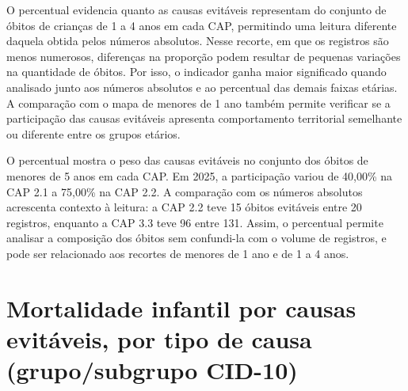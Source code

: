 
O percentual evidencia quanto as causas evitáveis representam do conjunto de óbitos de crianças de 1 a 4 anos em cada CAP, permitindo uma leitura diferente daquela obtida pelos números absolutos. Nesse recorte, em que os registros são menos numerosos, diferenças na proporção podem resultar de pequenas variações na quantidade de óbitos. Por isso, o indicador ganha maior significado quando analisado junto aos números absolutos e ao percentual das demais faixas etárias. A comparação com o mapa de menores de 1 ano também permite verificar se a participação das causas evitáveis apresenta comportamento territorial semelhante ou diferente entre os grupos etários.


O percentual mostra o peso das causas evitáveis no conjunto dos óbitos de menores de 5 anos em cada CAP. Em 2025, a participação variou de 40,00\% na CAP 2.1 a 75,00\% na CAP 2.2. A comparação com os números absolutos acrescenta contexto à leitura: a CAP 2.2 teve 15 óbitos evitáveis entre 20 registros, enquanto a CAP 3.3 teve 96 entre 131. Assim, o percentual permite analisar a composição dos óbitos sem confundi-la com o volume de registros, e pode ser relacionado aos recortes de menores de 1 ano e de 1 a 4 anos.


\section{Mortalidade infantil por causas evitáveis, por tipo de causa (grupo/\allowbreak{}subgrupo CID-10)}

